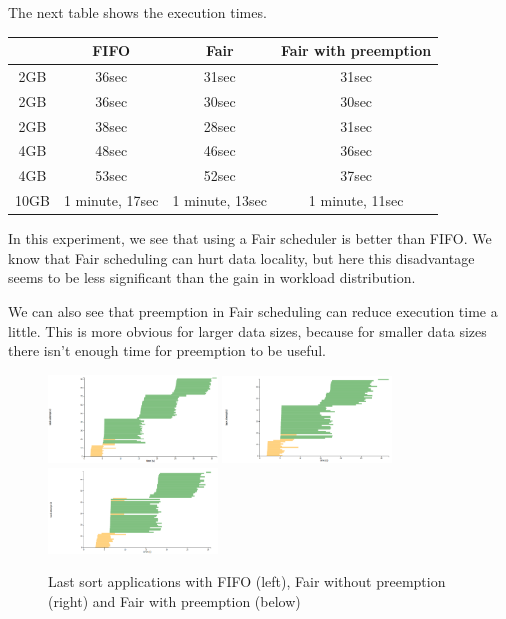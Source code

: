 \documentclass{article}
\begin{document}

The next table shows the execution times.

\begin{center}
\begin{tabular}{|c|c|c|c|}
\hline
\ & FIFO & Fair & Fair with preemption \\
\hline
2GB & 36sec & 31sec & 31sec \\
\hline
2GB & 36sec & 30sec & 30sec \\
\hline
2GB & 38sec & 28sec & 31sec \\
\hline
4GB & 48sec & 46sec & 36sec \\
\hline
4GB & 53sec & 52sec & 37sec \\
\hline
10GB & 1 minute, 17sec & 1 minute, 13sec & 1 minute, 11sec \\
\hline
\end{tabular}
\end{center}


In this experiment, we see that using a Fair scheduler is better than FIFO. We know that Fair scheduling can hurt data locality, but here this disadvantage seems to be less significant than the gain in workload distribution.

We can also see that preemption in Fair scheduling can reduce execution time a little. This is more obvious for larger data sizes, because for smaller data sizes there isn't enough time for preemption to be useful.



\begin{figure}%
  \centering
  \includegraphics[width=0.4\textwidth]{fifo2.png}
  \includegraphics[width=0.4\textwidth]{fair2.png}
  \includegraphics[width=0.4\textwidth]{fair_preemp2.png}
  \caption{Last sort applications with FIFO (left), Fair without preemption (right) and Fair with preemption (below)}
  \label{fair}
\end{figure}
\end{document}
